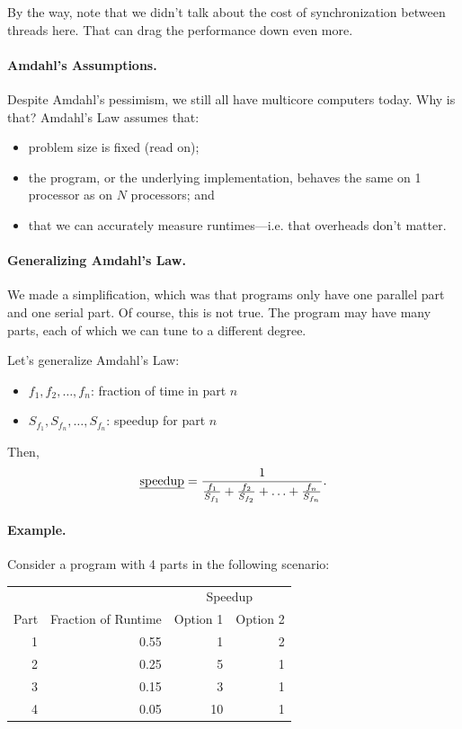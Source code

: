 By the way, note that we didn't talk about the cost of synchronization
between threads here. That can drag the performance down even more.

\paragraph{Amdahl's Assumptions.}
Despite Amdahl's pessimism, we still all have multicore computers today.
Why is that? Amdahl's Law assumes that:
\begin{itemize}[noitemsep]
    \item problem size is fixed (read on);
    \item the program, or the underlying implementation, behaves the same on 1 processor as on $N$ processors; and
    \item that we can accurately measure runtimes---i.e. that overheads don't matter.
\end{itemize}

\paragraph{Generalizing Amdahl's Law.} We made a simplification,
which was that programs only have one parallel part and one serial part.
Of course, this is not true. The program may have many parts,
 each of which we can tune to a different degree.

Let's generalize Amdahl's Law:

\begin{itemize}
\item  $f_1, f_2, \ldots, f_n$: fraction of time in part $n$
\item  $S_{f_1}, S_{f_n}, \ldots, S_{f_n}$: speedup for part $n$
\end{itemize}

Then,
\[\mbox{\em speedup} = \frac{1}{\frac{f_1}{S_{f_1}} + \frac{f_2}{S_{f_2}} + \ldots +
     \frac{f_n}{S_{f_n}}}.\]

\paragraph{Example.} Consider a program with 4 parts in the following scenario:

\begin{center}
     \begin{tabular}{r|r|r|r}
     \multicolumn{2}{l}{} & \multicolumn{2}{|c}{Speedup} \\
     Part & Fraction of Runtime & Option 1 & Option 2\\
     \hline
     1 & 0.55 & 1  & 2\\
     2 & 0.25 & 5  & 1\\
     3 & 0.15 & 3  & 1\\
     4 & 0.05  & 10 & 1\\
     \end{tabular}
 \end{center}

